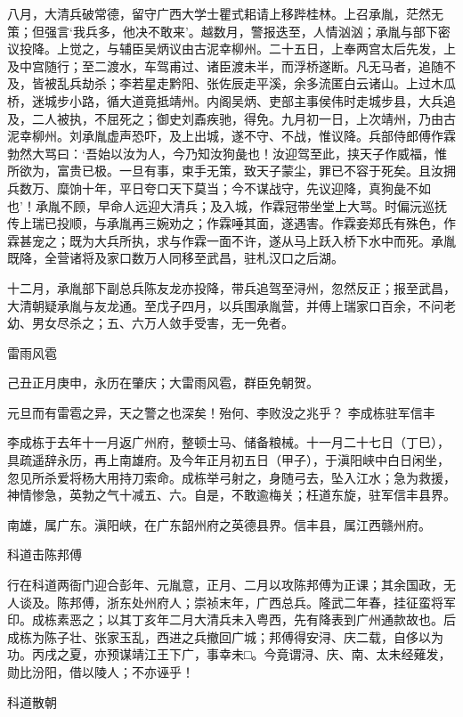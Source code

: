 \documentclass[]{article}
\begin{document}
八月，大清兵破常德，留守广西大学士瞿式耜请上移跸桂林。上召承胤，茫然无策；但强言`我兵多，他决不敢来'。越数月，警报迭至，人情汹汹；承胤与部下密议投降。上觉之，与辅臣吴炳议由古泥幸柳州。二十五日，上奉两宫太后先发，上及中宫随行；至二渡水，车驾甫过、诸臣渡未半，而浮桥遂断。凡无马者，追随不及，皆被乱兵劫杀；李若星走黔阳、张佐辰走平溪，余多流匿白云诸山。上过木瓜桥，迷城步小路，循大道竟抵靖州。内阁吴炳、吏部主事侯伟时走城步县，大兵追及，二人被执，不屈死之；御史刘鼒疾驰，得免。九月初一日，上次靖州，乃由古泥幸柳州。刘承胤虚声恐吓，及上出城，遂不守、不战，惟议降。兵部侍郎傅作霖勃然大骂曰：`吾始以汝为人，今乃知汝狗彘也！汝迎驾至此，挟天子作威福，惟所欲为，富贵已极。一旦有事，束手无策，致天子蒙尘，罪已不容于死矣。且汝拥兵数万、糜饷十年，平日夸口天下莫当；今不谋战守，先议迎降，真狗彘不如也'！承胤不顾，早命人远迎大清兵；及入城，作霖冠带坐堂上大骂。时偏沅巡抚传上瑞已投顺，与承胤再三婉劝之；作霖唾其面，遂遇害。作霖妾郑氏有殊色，作霖甚宠之；既为大兵所执，求与作霖一面不许，遂从马上跃入桥下水中而死。承胤既降，全营诸将及家口数万人同移至武昌，驻札汉口之后湖。

十二月，承胤部下副总兵陈友龙亦投降，带兵追驾至浔州，忽然反正；报至武昌，大清朝疑承胤与友龙通。至戊子四月，以兵围承胤营，并傅上瑞家口百余，不问老幼、男女尽杀之；五、六万人敛手受害，无一免者。

雷雨风雹

己丑正月庚申，永历在肇庆；大雷雨风雹，群臣免朝贺。

元旦而有雷雹之异，天之警之也深矣！殆何、李败没之兆乎？ 李成栋驻军信丰

李成栋于去年十一月返广州府，整顿士马、储备粮械。十一月二十七日（丁巳），具疏遥辞永历，再上南雄府。及今年正月初五日（甲子），于滇阳峡中白日闲坐，忽见所杀爱将杨大用持刀索命。成栋举弓射之，身随弓去，坠入江水；急为救援，神情惨急，英勃之气十减五、六。自是，不敢逾梅关；枉道东旋，驻军信丰县界。

南雄，属广东。滇阳峡，在广东韶州府之英德县界。信丰县，属江西赣州府。

科道击陈邦傅

行在科道两衙门迎合彭年、元胤意，正月、二月以攻陈邦傅为正课；其余国政，无人谈及。陈邦傅，浙东处州府人；崇祯末年，广西总兵。隆武二年春，挂征蛮将军印。成栋素恶之；以其丁亥年二月大清兵未入粤西，先有降表到广州通款故也。后成栋为陈子壮、张家玉乱，西进之兵撤回广城；邦傅得安浔、庆二载，自侈以为功。丙戌之夏，亦预谋靖江王下广，事幸未□。今竟谓浔、庆、南、太未经薙发，勋比汾阳，借以陵人；不亦诬乎！

科道散朝
\end{document}

